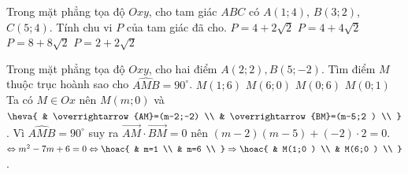 \begin{ex}%
	Trong mặt phẳng tọa độ $Oxy$, cho tam giác $ABC$ có $A(1;4)$, $B(3;2)$, $C(5;4)$. Tính chu vi $P$ của tam giác đã cho.
	\choice
	{$P=4+2\sqrt{2}$}
	{\True $P=4+4\sqrt{2}$}
	{$P=8+8\sqrt{2}$}
	{$P=2+2\sqrt{2}$}
\end{ex}

\begin{ex}%
	Trong mặt phẳng tọa độ $Oxy$, cho hai điểm $A(2;2 ),B(5;-2 )$.  Tìm điểm $M$ thuộc trục hoành sao cho $\widehat{AMB}=90^\circ$.
	\choice
	{$M(1;6 )$}
	{\True $M(6;0 )$}
	{$M(0;6 )$}
	{$M(0;1 )$}
	\loigiai
	{Ta có $M\in Ox$ nên $M(m;0 )$ và $\heva{
			& \overrightarrow{AM}=(m-2;-2) \\
			& \overrightarrow{BM}=(m-5;2 ) \\
		}$.
		Vì $\widehat{AMB}=90^\circ$ suy ra $\overrightarrow{AM}\cdot\overrightarrow{BM}=0$ nên $(m-2 )(m-5 )+(-2 )\cdot2=0$.
		$\Leftrightarrow m^2-7m+6=0\Leftrightarrow \hoac{
			& m=1 \\
			& m=6 \\
		} \Rightarrow\hoac{
			& M(1;0 ) \\
			& M(6;0 ) \\
		}$. }
\end{ex}

